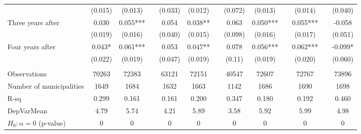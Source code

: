 \begin{tabular}{lcccccccccccc}
      & (0.015) & (0.013) &       & (0.033) & (0.012) &       & (0.072) & (0.013) &       & (0.014) &       & (0.040) \\
Three years after & 0.030 & 0.055*** &       & 0.054 & 0.038** &       & 0.063 & 0.050*** &       & 0.055*** &       & -0.058 \\
      & (0.019) & (0.016) &       & (0.040) & (0.015) &       & (0.098) & (0.016) &       & (0.017) &       & (0.051) \\
Four years after & 0.043* & 0.061*** &       & 0.053 & 0.047** &       & 0.078 & 0.056*** &       & 0.062*** &       & -0.099* \\
      & (0.022) & (0.019) &       & (0.047) & (0.019) &       & (0.11) & (0.019) &       & (0.020) &       & (0.060) \\
      &       &       &       &       &       &       &       &       &       &       &       &  \\
\midrule
Observations & 70263 & 72383 &       & 63121 & 72151 &       & 40547 & 72607 &       & 72767 &       & 73896 \\
Number of municipalities & 1649  & 1684  &       & 1632  & 1663  &       & 1142  & 1686  &       & 1690  &       & 1698 \\
R-sq  & 0.299 & 0.161 &       & 0.161 & 0.200 &       & 0.347 & 0.180 &       & 0.192 &       & 0.460 \\
DepVarMean & 4.79  & 5.74  &       & 4.21  & 5.89  &       & 3.58  & 5.92  &       & 5.99  &       & 4.98 \\
$H_0 : \alpha = 0$ (p-value) & 0     & 0     &       & 0     & 0     &       & 0     & 0     &       & 0     &       & 0 \\
\bottomrule
\bottomrule
\end{tabular}%
